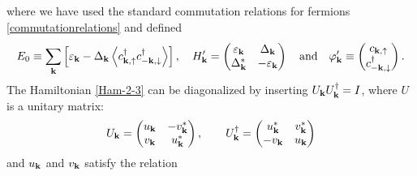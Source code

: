 where we have used the standard commutation relations for fermions \eqref{commutationrelations} and defined 
\begin{equation*}
    E_0 \equiv \sum_{\bf{k}} \left[ \varepsilon_{\mathbf{k}} - \Delta_{\bf{k}}\left<c_{\bf{k},\uparrow}^{\dagger} c_{-\bf{k},\downarrow}^{\dagger} \right> \right],
    \quad
    H_{\mathbf{k}}' = 
    \begin{pmatrix}
        \varepsilon_{\bf{k}} & \Delta_{\bf{k}}\\
        \Delta_{\bf{k}}^* & -\varepsilon_{\bf{k}} 
    \end{pmatrix}
    \quad \mathrm{and} \quad 
    \varphi_{\mathbf{k}}' \equiv \begin{pmatrix} c_{\bf{k},\uparrow} \\ c_{-\bf{k},\downarrow}^{\dagger} \end{pmatrix}.
\end{equation*}
The Hamiltonian \eqref{Ham-2-3} can be diagonalized by inserting $U_{\mathbf{k}}U_{\mathbf{k}}^{\dagger} = I$, where $U$ is a unitary matrix:
\begin{equation}
U_{\mathbf{k}} =
\begin{pmatrix}
    u_{\mathbf{k}} & -v_{\mathbf{k}}^* \\
    v_{\mathbf{k}} & u_{\mathbf{k}}^*
\end{pmatrix},
\qquad
U_{\mathbf{k}}^{\dagger} = 
\begin{pmatrix}
    u_{\mathbf{k}}^* & v_{\mathbf{k}}^* \\
    -v_{\mathbf{k}} & u_{\mathbf{k}}
\end{pmatrix}
\end{equation}
and $u_{\mathbf{k}}$ and $v_{\mathbf{k}}$ satisfy the relation

